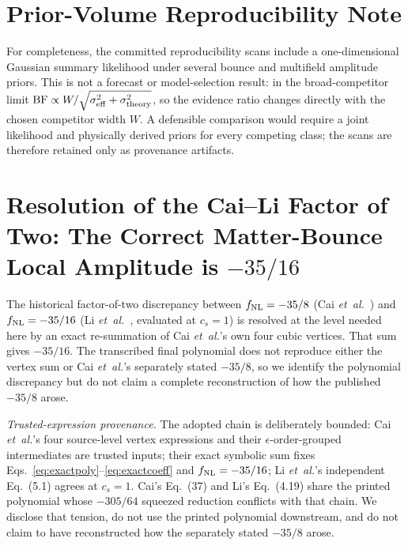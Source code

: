 \documentclass[aps,prd,twocolumn,superscriptaddress,showpacs,preprintnumbers,nofootinbib,longbibliography,floatfix]{revtex4-2}
\newcommand{\fnl}{f_{\rm NL}}
\newcommand{\etal}{\textit{et~al.}}
\begin{document}
\section{Prior-Volume Reproducibility Note}
\label{app:priorvolume}

For completeness, the committed reproducibility scans include a one-dimensional Gaussian summary likelihood under several bounce and multifield amplitude priors. This is not a forecast or model-selection result: in the broad-competitor limit $\mathrm{BF}\propto W/\sqrt{\sigma_{\rm eff}^2+\sigma_{\rm theory}^2}$, so the evidence ratio changes directly with the chosen competitor width $W$. A defensible comparison would require a joint likelihood and physically derived priors for every competing class; the scans are therefore retained only as provenance artifacts.

\section{Resolution of the Cai--Li Factor of Two: The Correct Matter-Bounce Local Amplitude is $-35/16$}
\label{app:convention}

The historical factor-of-two discrepancy between $\fnl = -35/8$ (Cai \textit{et~al.}~\cite{Cai:2009fn}) and $\fnl = -35/16$ (Li \etal~\cite{LiQuintin:2017}, evaluated at $c_s=1$) is resolved at the level needed here by an exact re-summation of Cai \etal's own four cubic vertices. That sum gives $-35/16$. The transcribed final polynomial does not reproduce either the vertex sum or Cai \etal's separately stated $-35/8$, so we identify the polynomial discrepancy but do not claim a complete reconstruction of how the published $-35/8$ arose.

\emph{Trusted-expression provenance.} The adopted chain is deliberately bounded: Cai \etal's four source-level vertex expressions and their $\epsilon$-order-grouped intermediates are trusted inputs; their exact symbolic sum fixes Eqs.~\eqref{eq:exactpoly}--\eqref{eq:exactcoeff} and $\fnl=-35/16$; Li \etal's independent Eq.~(5.1) agrees at $c_s=1$. Cai's Eq.~(37) and Li's Eq.~(4.19) share the printed polynomial whose $-305/64$ squeezed reduction conflicts with that chain. We disclose that tension, do not use the printed polynomial downstream, and do not claim to have reconstructed how the separately stated $-35/8$ arose.
\end{document}
